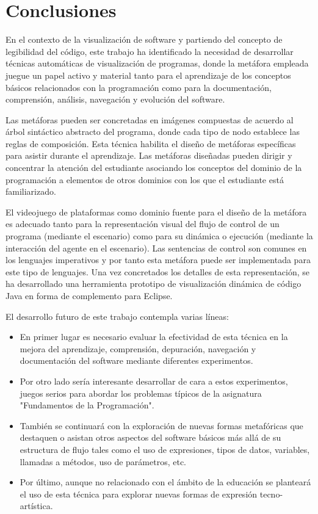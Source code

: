 \documentclass{llncs}
\begin{document}

\section{Conclusiones}
\label{sec:conclusions}

En el contexto de la visualización de software y partiendo del concepto de legibilidad del código, este trabajo ha identificado la necesidad de desarrollar técnicas automáticas de visualización de programas, donde la metáfora empleada juegue un papel activo y material tanto para el aprendizaje de los conceptos básicos relacionados con la programación como para la documentación, comprensión, análisis, navegación y evolución del software.

Las metáforas pueden ser concretadas en imágenes compuestas de acuerdo al árbol sintáctico abstracto del programa, donde cada tipo de nodo establece las reglas de composición. Esta técnica habilita el diseño de metáforas específicas para asistir durante el aprendizaje. Las metáforas diseñadas pueden dirigir y concentrar la atención del estudiante asociando los conceptos del dominio de la programación a elementos de otros dominios con los que el estudiante está familiarizado. 

El videojuego de plataformas como dominio fuente para el diseño de la metáfora es adecuado tanto para la representación visual del flujo de control de un programa (mediante el escenario) como para su dinámica o ejecución (mediante la interacción del agente en el escenario). Las sentencias de control son comunes en los lenguajes imperativos y por tanto esta metáfora puede ser implementada para este tipo de lenguajes. Una vez concretados los detalles de esta representación, se ha desarrollado una herramienta prototipo de visualización dinámica de código Java en forma de complemento para Eclipse. 

El desarrollo futuro de este trabajo contempla varias líneas:
\begin{itemize}
\item En primer lugar es necesario evaluar la efectividad de esta técnica en la mejora del aprendizaje, comprensión, depuración, navegación y documentación del software mediante diferentes experimentos.
\item Por otro lado sería interesante desarrollar de cara a estos experimentos, juegos serios para abordar los problemas típicos de la asignatura "Fundamentos de la Programación".
\item También se continuará con la exploración de nuevas formas metafóricas que destaquen o asistan otros aspectos del software básicos más allá de su estructura de flujo tales como el uso de expresiones, tipos de datos, variables, llamadas a métodos, uso de parámetros, etc.
\item Por último, aunque no relacionado con el ámbito de la educación se planteará el uso de esta técnica para explorar nuevas formas de expresión tecno-artística.
\end{itemize}
\end{document}
